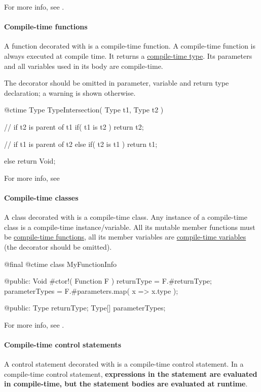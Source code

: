 For more info, see .

\paragraph{Compile-time functions}
A function decorated with  is a compile-time function. A compile-time function is always executed at compile time. It returns a \hyperref[ctime:class]{compile-time type}. Its parameters and all variables used in its body are compile-time.

The  decorator should be omitted in parameter, variable and return type declaration; a warning is shown otherwise.

\begin{code}
@ctime Type TypeIntersection( Type t1, Type t2 ) {
	// if t2 is parent of t1
	if( t1 is t2 )
		return t2;
		
	// if t1 is parent of t2
	else if( t2 is t1 )
		return t1;
	
	else
		return Void;
}
\end{code}

For more info, see 

\paragraph{Compile-time classes}
A class decorated with  is a compile-time class. Any instance of a compile-time class is a compile-time instance/variable. All its mutable member functions must be \hyperref[ctime:function]{compile-time functions}, all its member variables are \hyperref[ctime:variable]{compile-time variables} (the  decorator should be omitted).

\begin{code}
@final @ctime class MyFunctionInfo {

@public:
	Void #ctor!( Function F ) {
		returnType = F.#returnType;
		parameterTypes = F.#parameters.map( x => x.type );
	}
	
@public:
	Type returnType;
	Type[] parameterTypes;	
	
}
\end{code}

For more info, see .

\paragraph{Compile-time control statements}
A control statement decorated with  is a compile-time control statement. In a compile-time control statement, \textbf{expressions in the statement are evaluated in compile-time, but the statement bodies are evaluated at runtime}.

